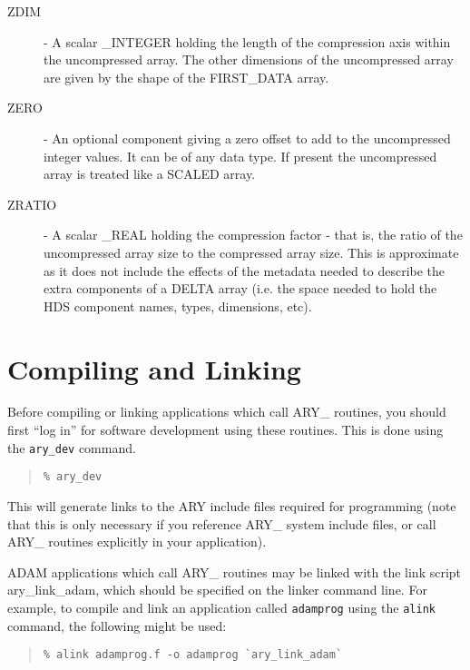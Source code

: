 \documentclass[twoside,11pt]{article}
\newcommand{\xlabel}[1]{}
\begin{document}
\begin{description}
\item[ZDIM] - A scalar \_INTEGER holding the length of the compression axis
within the uncompressed array. The other dimensions of the uncompressed array
are given by the shape of the FIRST\_DATA array.

\item[ZERO] - An optional component giving a zero offset to add to the
uncompressed integer values. It can be of any data type. If present the
uncompressed array is treated like a SCALED array.

\item[ZRATIO] - A scalar \_REAL holding the compression factor - that is, the
ratio of the uncompressed array size to the compressed array size. This
is approximate as it does not include the effects of the metadata needed
to describe the extra components of a DELTA array (i.e. the space needed
to hold the HDS component names, types, dimensions, etc).

\end{description}

\section{\xlabel{compiling_and_linking}Compiling and Linking}
\label{compiling_and_linking}

Before compiling or linking applications which call ARY\_ routines, you
should first ``log in'' for software development using these routines.
This is done using the \texttt{ary\_dev} command.

\begin{quote}\begin{verbatim}
% ary_dev
\end{verbatim}\end{quote}

This will generate links to the ARY include files required for
programming (note that this is only necessary if you reference ARY\_
system include files, or call ARY\_ routines explicitly in your
application).

ADAM applications which call ARY\_ routines may be linked with the link
script \mbox{ary\_link\_adam}, which should be specified on the linker
command line.  For example, to compile and link an application called
\texttt{adamprog} using the \texttt{alink} command, the following might be
used:

\begin{quote}\begin{verbatim}
% alink adamprog.f -o adamprog `ary_link_adam`
\end{verbatim}\end{quote}
\end{document}

